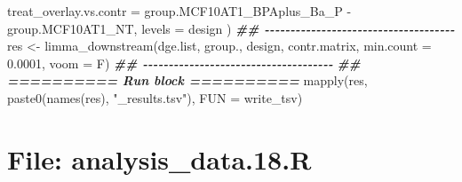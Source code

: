 \documentclass[
]{article}
\newenvironment{Shaded}{\begin{snugshade}}{\end{snugshade}}
\newcommand{\AttributeTok}[1]{\textcolor[rgb]{0.77,0.63,0.00}{#1}}
\newcommand{\DocumentationTok}[1]{\textcolor[rgb]{0.56,0.35,0.01}{\textbf{\textit{#1}}}}
\newcommand{\FloatTok}[1]{\textcolor[rgb]{0.00,0.00,0.81}{#1}}
\newcommand{\FunctionTok}[1]{\textcolor[rgb]{0.00,0.00,0.00}{#1}}
\newcommand{\NormalTok}[1]{#1}
\newcommand{\OtherTok}[1]{\textcolor[rgb]{0.56,0.35,0.01}{#1}}
\newcommand{\SpecialCharTok}[1]{\textcolor[rgb]{0.00,0.00,0.00}{#1}}
\newcommand{\StringTok}[1]{\textcolor[rgb]{0.31,0.60,0.02}{#1}}
\begin{document}
\begin{Shaded}
\begin{Highlighting}[]
  \AttributeTok{treat\_overlay.vs.contr =}\NormalTok{ group.MCF10AT1\_BPAplus\_Ba\_P }\SpecialCharTok{{-}}\NormalTok{ group.MCF10AT1\_NT,}
  \AttributeTok{levels =}\NormalTok{ design}
\NormalTok{)}
\DocumentationTok{\#\# {-}{-}{-}{-}{-}{-}{-}{-}{-}{-}{-}{-}{-}{-}{-}{-}{-}{-}{-}{-}{-}{-}{-}{-}{-}{-}{-}{-}{-}{-}{-}{-}{-}{-}{-}{-}{-} }
\NormalTok{res }\OtherTok{\textless{}{-}} \FunctionTok{limma\_downstream}\NormalTok{(dge.list, group., design, contr.matrix,}
                        \AttributeTok{min.count =} \FloatTok{0.0001}\NormalTok{, }\AttributeTok{voom =}\NormalTok{ F)}
\DocumentationTok{\#\# {-}{-}{-}{-}{-}{-}{-}{-}{-}{-}{-}{-}{-}{-}{-}{-}{-}{-}{-}{-}{-}{-}{-}{-}{-}{-}{-}{-}{-}{-}{-}{-}{-}{-}{-}{-}{-} }
\DocumentationTok{\#\# ========== Run block ========== }
\FunctionTok{mapply}\NormalTok{(res, }\FunctionTok{paste0}\NormalTok{(}\FunctionTok{names}\NormalTok{(res), }\StringTok{"\_results.tsv"}\NormalTok{), }\AttributeTok{FUN =}\NormalTok{ write\_tsv)}
\end{Highlighting}
\end{Shaded}

\hypertarget{file-analysis_data.18.r}{%
\section{File: analysis\_data.18.R}\label{file-analysis_data.18.r}}
\end{document}
